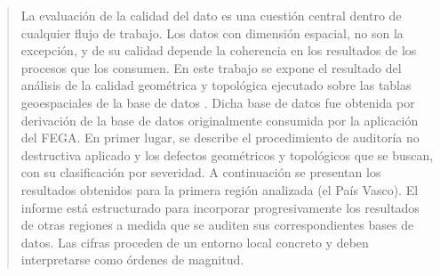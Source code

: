 \begin{abstract}
	La evaluación de la calidad del dato es una cuestión central dentro de cualquier flujo de trabajo. Los datos con dimensión espacial, no son la excepción, y de su calidad depende la coherencia en los resultados de los procesos que los consumen. En este trabajo se expone el resultado del análisis de la calidad geométrica y topológica ejecutado sobre las tablas geoespaciales de la base de datos . Dicha base de datos fue obtenida por derivación de la base de datos originalmente consumida por la aplicación del FEGA. En primer lugar, se describe el procedimiento de auditoría no destructiva aplicado y los defectos geométricos y topológicos que se buscan, con su clasificación por severidad. A continuación se presentan los resultados obtenidos para la primera región analizada (el País Vasco). El informe está estructurado para incorporar progresivamente los resultados de otras regiones a medida que se auditen sus correspondientes bases de datos. Las cifras proceden de un entorno local concreto y deben interpretarse como órdenes de magnitud.
\end{abstract}

